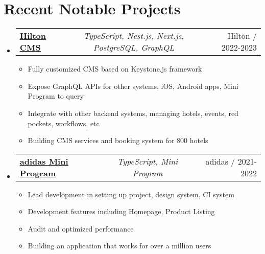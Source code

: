 \documentclass[a4paper,11pt]{article}
\makeatletter
\newcommand{\resumeItem}[1]{
  \item\small{#1}
}
\newcommand{\resumeItemListStart}{\begin{itemize}[rightmargin=0.11in]}
\newcommand{\resumeItemListEnd}{\end{itemize}}
\newcommand{\resumeTrioHeading}[3]{
  \item\small{
    \begin{tabular*}{0.96\textwidth}[t]{
      l@{\extracolsep{\fill}}c@{\extracolsep{\fill}}r
    }
      \textbf{#1} & \textit{#2} & #3
    \end{tabular*}
  }
}
\newcommand{\resumeHeadingListStart}{
  \begin{itemize}[leftmargin=0.15in, label={}]
}
\newcommand{\resumeHeadingListEnd}{\end{itemize}}
\makeatother
\begin{document}
\section{Recent Notable Projects}
  \resumeHeadingListStart{}
      \resumeTrioHeading{\href{https://digital-cms.hilton.com.cn/control-panel}{\uline{Hilton CMS}}}{TypeScript, Nest.js, Next.js, PostgreSQL, GraphQL}{Hilton / 2022-2023}
      \resumeItemListStart{}
        \resumeItem{Fully customized CMS based on Keystone.js framework}
        \resumeItem{Expose GraphQL APIs for other systems, iOS, Android apps, Mini Program to query}
        \resumeItem{Integrate with other backend systems, managing hotels, events, red pockets, workflows, etc}
        \resumeItem{Building CMS services and booking system for 800 hotels}
      \resumeItemListEnd{}

    \resumeTrioHeading{\href{https://adidas.com/}{\uline{adidas Mini Program}}}{TypeScript, Mini Program}{adidas / 2021-2022}
      \resumeItemListStart{}
        \resumeItem{Lead development in setting up project, design system, CI system}
        \resumeItem{Development features including Homepage, Product Listing}
        \resumeItem{Audit and optimized performance}
        \resumeItem{Building an application that works for over a million users}
      \resumeItemListEnd{}
  \resumeHeadingListEnd{}
\end{document}
